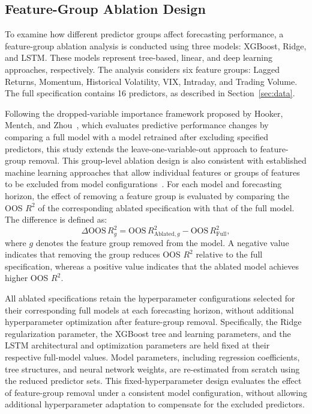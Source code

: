 \documentclass[runningheads,orivec]{llncs}
\begin{document}
\subsection{Feature-Group Ablation Design}\label{subsec:ablation_design}

To examine how different predictor groups affect forecasting performance, a feature-group ablation analysis is conducted using three models: XGBoost, Ridge, and LSTM. These models represent tree-based, linear, and deep learning approaches, respectively. The analysis considers six feature groups: Lagged Returns, Momentum, Historical Volatility, VIX, Intraday, and Trading Volume. The full specification contains 16 predictors, as described in Section~\ref{sec:data}.

Following the dropped-variable importance framework proposed by Hooker, Mentch, and Zhou~\cite{hooker2021}, which evaluates predictive performance changes by comparing a full model with a model retrained after excluding specified predictors, this study extends the leave-one-variable-out approach to feature-group removal. This group-level ablation design is also consistent with established machine learning approaches that allow individual features or groups of features to be excluded from model configurations~\cite{sheikholeslami2021}. For each model and forecasting horizon, the effect of removing a feature group is evaluated by comparing the OOS $R^2$ of the corresponding ablated specification with that of the full model. The difference is defined as:
\begin{equation}\label{eq:delta_oos_r2}
\Delta \mathrm{OOS}\,R^2_g = \mathrm{OOS}\,R^2_{\text{Ablated},g} - \mathrm{OOS}\,R^2_{\text{Full}},
\end{equation}
where $g$ denotes the feature group removed from the model. A negative value indicates that removing the group reduces OOS $R^2$ relative to the full specification, whereas a positive value indicates that the ablated model achieves higher OOS $R^2$.

All ablated specifications retain the hyperparameter configurations selected for their corresponding full models at each forecasting horizon, without additional hyperparameter optimization after feature-group removal. Specifically, the Ridge regularization parameter, the XGBoost tree and learning parameters, and the LSTM architectural and optimization parameters are held fixed at their respective full-model values. Model parameters, including regression coefficients, tree structures, and neural network weights, are re-estimated from scratch using the reduced predictor sets. This fixed-hyperparameter design evaluates the effect of feature-group removal under a consistent model configuration, without allowing additional hyperparameter adaptation to compensate for the excluded predictors.
\end{document}
